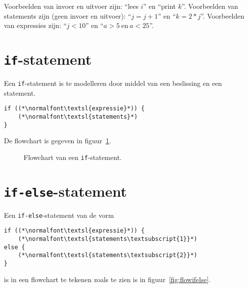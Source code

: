 Voorbeelden van invoer en uitvoer zijn: ``lees $i$'' en ``print $k$''. Voorbeelden
van statements zijn (geen invoer en uitvoer): ``$j = j+1$'' en ``$k=2*j$''.
Voorbeelden van expressies zijn: ``$j<10$'' en ``$a>5 \mathrm{\ en\ } a<25$''.


\section{\texttt{if}-statement}
Een \texttt{if}-statement is te modelleren door middel van een beslissing en een statement.

\begin{lstlisting}[caption=\texttt{if}-statement in C]
if ((*\normalfont\textsl{expressie}*)) {
    (*\normalfont\textsl{statements}*)
}
\end{lstlisting}

De flowchart is gegeven in figuur~\ref{fig:flowif}.

\begin{figure}[!ht]
\centering
{}
\caption{Flowchart van een \texttt{if}-statement.}
\label{fig:flowif}
\end{figure}


\section{\texttt{if-else}-statement}

Een \texttt{if-else}-statement van de vorm

\begin{lstlisting}[caption=\texttt{if-else}-statement in C.]
if ((*\normalfont\textsl{expressie}*)) {
    (*\normalfont\textsl{statements\textsubscript{1}}*)
else {
    (*\normalfont\textsl{statements\textsubscript{2}}*)
}
\end{lstlisting}

is in een flowchart te tekenen zoals te zien is in figuur~\ref{fig:flowifelse}.

